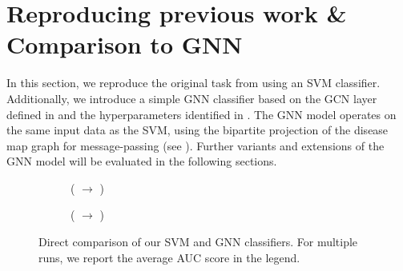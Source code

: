 \documentclass[
	fontsize=10pt, %
	twoside=true, %
	secnumdepth=1, %
  toc=indentunnumbered %
]{kaobook}
\begin{document}
\section{Reproducing previous work \& Comparison to GNN}
\label{sec:reproducing}

In this section, we reproduce the original task from \nielsen{} using an SVM
classifier. Additionally, we introduce a simple GNN classifier based on the
GCN layer defined in  and the hyperparameters identified
in . The GNN model operates on
the same input data as the SVM, using the bipartite projection of the disease
map graph for message-passing (see ). Further
variants and extensions of the GNN model will be evaluated in the following
sections.




%
\begin{figure}[h]
  \centering
  \begin{subfigure}[h]{0.49\linewidth}
    \caption{(\ADMap{} $\rightarrow$ \PDMap)}
  \end{subfigure}
  \begin{subfigure}[h]{0.49\linewidth}
    \caption{(\ADMap{} $\rightarrow$ \ReconMap)}
  \end{subfigure}
  \caption{Direct comparison of our SVM and GNN classifiers. For multiple runs,
    we report the average AUC score in the legend.}
  \label{fig:svm-repro-results}
\end{figure}
\end{document}
